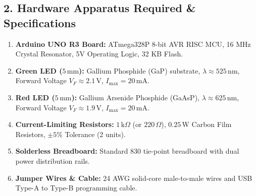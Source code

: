 \documentclass[11pt,a4paper]{article}
\begin{document}
\subsection*{2. Hardware Apparatus Required \& Specifications}
\begin{enumerate}[noitemsep]
    \item \textbf{Arduino UNO R3 Board:} ATmega328P 8-bit AVR RISC MCU, 16 MHz Crystal Resonator, 5V Operating Logic, 32 KB Flash.
    \item \textbf{Green LED ($5\,\text{mm}$):} Gallium Phosphide (GaP) substrate, $\lambda \approx 525\,\text{nm}$, Forward Voltage $V_F \approx 2.1\,\text{V}$, $I_{\max} = 20\,\text{mA}$.
    \item \textbf{Red LED ($5\,\text{mm}$):} Gallium Arsenide Phosphide (GaAsP), $\lambda \approx 625\,\text{nm}$, Forward Voltage $V_F \approx 1.9\,\text{V}$, $I_{\max} = 20\,\text{mA}$.
    \item \textbf{Current-Limiting Resistors:} $1\,\text{k}\Omega$ (or $220\,\Omega$), $0.25\,\text{W}$ Carbon Film Resistors, $\pm 5\%$ Tolerance (2 units).
    \item \textbf{Solderless Breadboard:} Standard 830 tie-point breadboard with dual power distribution rails.
    \item \textbf{Jumper Wires \& Cable:} 24 AWG solid-core male-to-male wires and USB Type-A to Type-B programming cable.
\end{enumerate}
\end{document}

